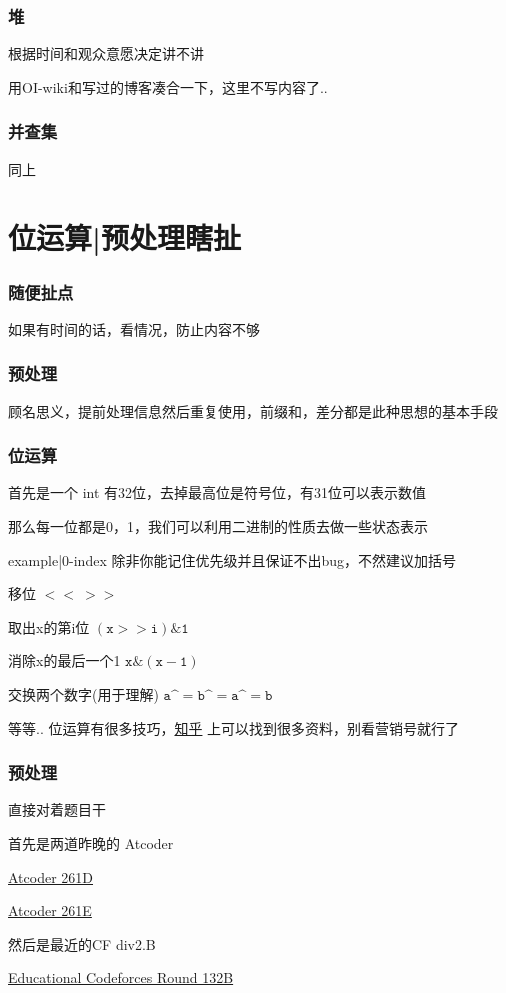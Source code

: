 \documentclass{beamer}
\begin{document}
  \begin{frame}
    \frametitle{堆}
      根据时间和观众意愿决定讲不讲

      用OI-wiki和写过的博客凑合一下，这里不写内容了..
  \end{frame}

  \begin{frame}
    \frametitle{并查集}
      同上
  \end{frame}

  \section{位运算|预处理瞎扯}
  \begin{frame}
    \frametitle{随便扯点}
    如果有时间的话，看情况，防止内容不够
  \end{frame}

  \begin{frame}
    \frametitle{预处理}

    顾名思义，提前处理信息然后重复使用，前缀和，差分都是此种思想的基本手段

  \end{frame}

  \begin{frame}
    \frametitle{位运算}

    首先是一个 int 有32位，去掉最高位是符号位，有31位可以表示数值

    那么每一位都是0，1，我们可以利用二进制的性质去做一些状态表示

    \begin{block}{example|0-index}
      除非你能记住优先级并且保证不出bug，不然建议加括号

      移位 $\mathtt{<<\ >>}$

      取出x的第i位 $\mathtt{(x>>i)\&1}$

      消除x的最后一个1 $\mathtt{x\&{(x-1)}}$

      交换两个数字(用于理解) $\mathtt{a\^{} =b\^{} =a\^{} =b}$

    \end{block}

    等等.. 位运算有很多技巧，\href{https://www.zhihu.com/question/38206659}{知乎}
    上可以找到很多资料，别看营销号就行了
  \end{frame}

  \begin{frame}
    \frametitle{预处理}
    直接对着题目干

    首先是两道昨晚的 Atcoder

    \href{https://atcoder.jp/contests/abc261/tasks/abc261_d}{Atcoder 261D}
    
    \href{https://atcoder.jp/contests/abc261/tasks/abc261_e}{Atcoder 261E}

    然后是最近的CF div2.B

    \href{https://codeforces.com/contest/1709/problem/B}{Educational Codeforces Round 132B}
  \end{frame}
\end{document}
